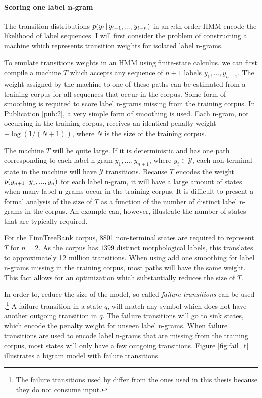 \paragraph{Scoring one label n-gram} The transition distributions $p(y_i\mbox{$ \, | \, $}
y_{i - 1}, ..., y_{i - n})$ in an $n$th order HMM encode the likelihood of
label sequences. I will first consider the problem of constructing a
machine which represents transition weights for isolated label
n-grams. 

To emulate transitions weights in an HMM using finite-state calculus,
we can first compile a machine $T$ which accepts any sequence of $n+1$
labels $y_{1}, ..., y_{n+1}$. The weight assigned by the machine to
one of these paths can be estimated from a training corpus for all
sequences that occur in the corpus. Some form of smoothing is required
to score label n-grams missing from the training corpus. In
Publication \ref{pub:2}, a very simple form of smoothing is used. Each
n-gram, not occurring in the training corpus, receives an identical
penalty weight $-\log(1/(N+1))$, where $N$ is the size of the training
corpus. %


The machine $T$ will be quite large. If it is deterministic and has one path corresponding to
each label n-gram $y_1, ..., y_{n+1}$, where $y_i \in \mathcal{Y}$, each
non-terminal state in the machine will have $\mathcal{Y}$
transitions. Because $T$ encodes the weight $p(y_{n+1}\mbox{$ \, | \, $} y_{1},
..., y_{n})$ for each label n-gram, it will have a large amount of
states when many label n-grams occur in the training corpus. It is
difficult to present a formal analysis of the size of $T$ as a
function of the number of distinct label n-grams in the corpus. An
example can, however, illustrate the number of states that are
typically required.

For the FinnTreeBank corpus, 8801 non-terminal states are required to
represent $T$ for $n=2$. As the corpus has $1399$ distinct
morphological labels, this translates to approximately 12 million
transitions. When using add one smoothing for label n-grams missing in
the training corpus, most paths will have the same weight. This fact allows for an optimization which substantially reduces the size of $T$.

In order to, reduce the size of the model, so called {\it failure
  transitions} can be used \citep{Knuth1977,Mohri1997}.\footnote{The failure
  transitions used by \cite{Mohri1997} differ from the ones used in
  this thesis because they do not consume input.} A failure transition
in a state $q$, will match any symbol which does not have another
outgoing transition in $q$. The failure transitions will go to sink
states, which encode the penalty weight for unseen label n-grams. When
failure transitions are used to encode label n-grams that are missing
from the training corpus, most states will only have a few outgoing
transitions.  Figure \ref{fig:fail_t} illustrates a bigram model with
failure transitions.

